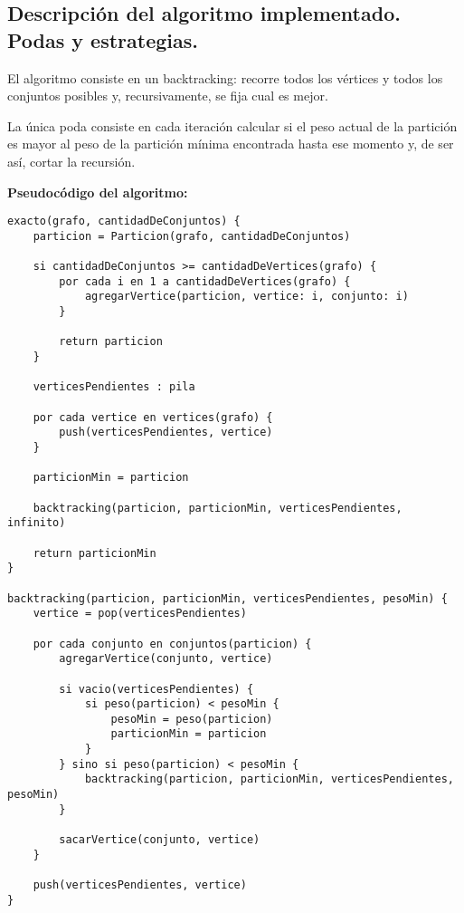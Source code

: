 \subsection{Descripción del algoritmo implementado. Podas y estrategias.}
\vspace*{0.3cm}

El algoritmo consiste en un backtracking: recorre todos los vértices y todos
los conjuntos posibles y, recursivamente, se fija cual es mejor.

La única poda consiste en cada iteración calcular si el peso actual de
la partición es mayor al peso de la partición mínima encontrada hasta
ese momento y, de ser así, cortar la recursión.

\vspace*{0.5cm}

\textbf{Pseudocódigo del algoritmo:}

\vspace*{0.3cm}

\begin{verbatim}
exacto(grafo, cantidadDeConjuntos) {
    particion = Particion(grafo, cantidadDeConjuntos)

    si cantidadDeConjuntos >= cantidadDeVertices(grafo) {
        por cada i en 1 a cantidadDeVertices(grafo) {
            agregarVertice(particion, vertice: i, conjunto: i)
        }

        return particion
    }

    verticesPendientes : pila

    por cada vertice en vertices(grafo) {
        push(verticesPendientes, vertice)
    }

    particionMin = particion

    backtracking(particion, particionMin, verticesPendientes, infinito)

    return particionMin
}

backtracking(particion, particionMin, verticesPendientes, pesoMin) {
    vertice = pop(verticesPendientes)

    por cada conjunto en conjuntos(particion) {
        agregarVertice(conjunto, vertice)

        si vacio(verticesPendientes) {
            si peso(particion) < pesoMin {
                pesoMin = peso(particion)
                particionMin = particion
            }
        } sino si peso(particion) < pesoMin {
            backtracking(particion, particionMin, verticesPendientes, pesoMin)
        }

        sacarVertice(conjunto, vertice)
    }

    push(verticesPendientes, vertice)
}
\end{verbatim}

